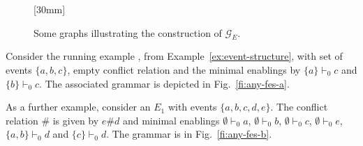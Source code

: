 \begin{figure}
{
  }
  \hfill
  [30mm]
  {
  }
  \hfill
  \mbox{}
  \caption{Some graphs illustrating the construction of $\mathcal{G}_E$.}
  \label{fi:any-fes}
\end{figure}


\begin{example}
  \label{ex:final}
  Consider the running example {\esabbr}, from
  Example~\ref{ex:event-structure}, with set of events
  $\{ a, b, c \}$, empty conflict relation and the minimal enablings by
  $\{a\} \vdash_0 c$ and $\{b\} \vdash_0 c$. The associated grammar is
  depicted in Fig.~\ref{fi:any-fes-a}.
  
  As a further example, consider an {\esabbr} $E_1$ with events
  $\{ a, b, c, d, e \}$. The conflict relation $\#$ is given by
  $e \# d$ and minimal enablings $\emptyset \vdash_0 a$,
  $\emptyset \vdash_0 b$, $\emptyset \vdash_0 c$, $\emptyset \vdash_0 e$,
  $\{a, b\} \vdash_0 d$ and $\{c\} \vdash_0 d$. The grammar is in
  Fig.~\ref{fi:any-fes-b}.
\end{example}


